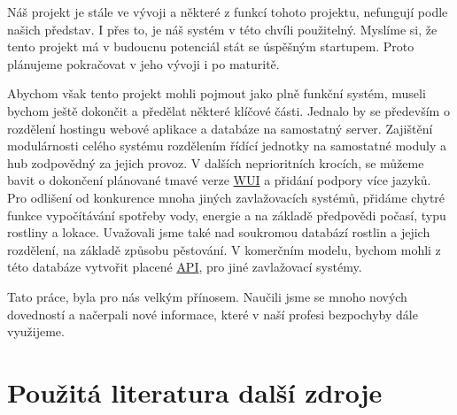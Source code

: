 \documentclass[czech,12pt,a4paper]{article}
\begin{document}
Náš projekt je stále ve vývoji a některé z funkcí tohoto projektu, nefungují podle našich představ. I přes to, je náš systém v této chvíli použitelný. Myslíme si, že tento projekt má v budoucnu potenciál stát se úspěšným startupem. Proto plánujeme pokračovat v jeho vývoji i po maturitě.

Abychom však tento projekt mohli pojmout jako plně funkční systém, museli bychom ještě dokončit a předělat některé klíčové části. Jednalo by se především o rozdělení hostingu webové aplikace a databáze na samostatný server. Zajištění modulárnosti celého systému rozdělením řídící jednotky na samostatné moduly a hub zodpovědný za jejich provoz. V dalších neprioritních krocích, se můžeme bavit o dokončení plánované tmavé verze \underline{\ac{WUI}} a přidání podpory více jazyků. Pro odlišení od konkurence mnoha jiných zavlažovacích systémů, přidáme chytré funkce vypočítávání spotřeby vody, energie a na základě předpovědi počasí, typu rostliny a lokace. Uvažovali jsme také nad soukromou databází rostlin a jejich rozdělení, na základě způsobu pěstování. V komerčním modelu, bychom mohli z této databáze vytvořit placené \underline{\ac{API}}, pro jiné zavlažovací systémy.

Tato práce, byla pro nás velkým přínosem. Naučili jsme se mnoho nových dovedností a načerpali nové informace, které v naší profesi bezpochyby dále využijeme.

\clearpage

\section{Použitá literatura další zdroje }
\end{document}
